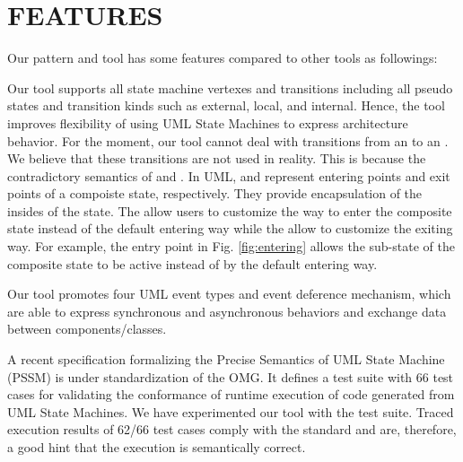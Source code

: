 \section{\uppercase{Features}}
\label{sec:uniqueness}
Our pattern and tool has some features compared to other tools as followings:

\vskip 0.1cm
\noindent
{} Our tool supports all state machine vertexes and transitions including all pseudo states and transition kinds such as external, local, and internal. 
Hence, the tool improves flexibility of using UML State Machines to express architecture behavior.
For the moment, our tool cannot deal with transitions from an  to an .
We believe that these transitions are not used in reality.
This is because the contradictory semantics of  and . 
In UML,  and  represent entering points and exit points of a compoiste state, respectively. 
They provide encapsulation of the insides of the state. 
The  allow users to customize the way to enter the composite state instead of the default entering way while the  allow to customize the exiting way.
For example, the  entry point in Fig. \ref{fig:entering} allows the  sub-state of the  composite state to be active instead of  by the default entering way.

\vskip 0.1cm
\noindent	
{} Our tool promotes four UML event types and event deference mechanism, which are able to express synchronous and asynchronous behaviors and exchange data between components/classes.

\vskip 0.1cm
\noindent	
{} A recent specification formalizing the Precise Semantics of UML State Machine (PSSM) is under standardization of the OMG.
It defines a test suite with 66 test cases for validating the conformance of runtime execution of code generated from UML State Machines.
We have experimented our tool with the test suite.
Traced execution results of 62/66 test cases comply with the standard and are, therefore, a good hint that the execution is semantically correct.


